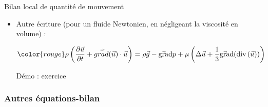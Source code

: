 \begin{frame}{Bilan local de quantité de mouvement }
\begin{itemize}
$(ii)$ Par un bilan des forces appliqué à un volume élémentaire $dV$.

\medskip
\pause

\item Autre écriture (pour un fluide Newtonien, en négligeant la viscosité en volume) :


	\begin{equation}
	\color{rouge}
		\rho \left( \dpdt{\myvec{u}} + \mytensor{grad} (\myvec{u}) \cdot \myvec{u}  \right)
		= 
		\rho \myvec{g}  - \gradient p + \mu \left( \Delta \myvec{u} + \frac{1}{3} \gradient (\divergence( \myvec{u})) \right)
	\end{equation}


Démo : exercice

\end{itemize}


\vspace{15mm}

\end{frame}

\subsubsection{Autres équations-bilan}




